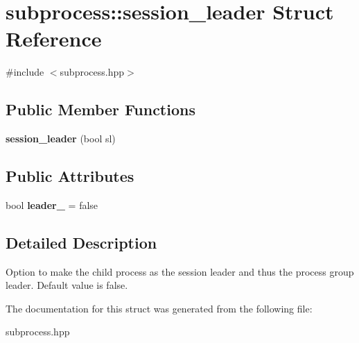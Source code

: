 \hypertarget{structsubprocess_1_1session__leader}{}\section{subprocess\+:\+:session\+\_\+leader Struct Reference}
\label{structsubprocess_1_1session__leader}


{\ttfamily \#include $<$subprocess.\+hpp$>$}

\subsection*{Public Member Functions}
\begin{DoxyCompactItemize}
\item 
\mbox{\label{structsubprocess_1_1session__leader_a60c994507df17e6422ff3985ea07e0b3}} 
{\bfseries session\+\_\+leader} (bool sl)
\end{DoxyCompactItemize}
\subsection*{Public Attributes}
\begin{DoxyCompactItemize}
\item 
\mbox{\label{structsubprocess_1_1session__leader_a2de89693dc715317dd26d760355fd9ce}} 
bool {\bfseries leader\+\_\+} = false
\end{DoxyCompactItemize}


\subsection{Detailed Description}
Option to make the child process as the session leader and thus the process group leader. Default value is false. 

The documentation for this struct was generated from the following file\+:\begin{DoxyCompactItemize}
\item 
subprocess.\+hpp\end{DoxyCompactItemize}
